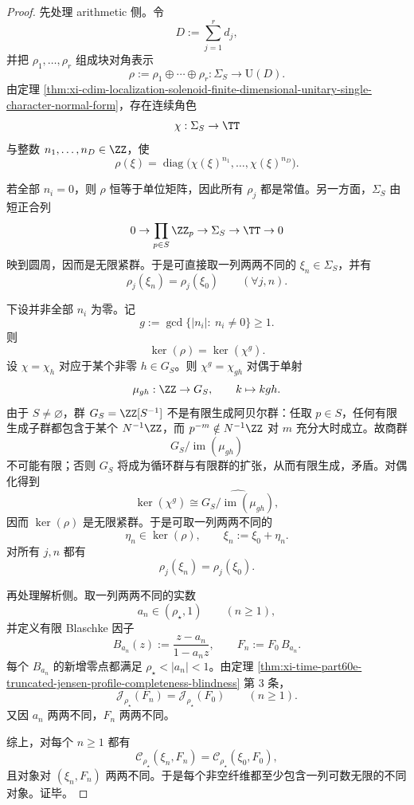 \begin{proof}
先处理 arithmetic 侧。令
\[
D:=\sum_{j=1}^r d_j,
\]
并把 \(\rho_1,\dots,\rho_r\) 组成块对角表示
\[
\rho:=\rho_1\oplus\cdots\oplus \rho_r:\Sigma_S\to \mathrm{U}(D).
\]
由定理 \ref{thm:xi-cdim-localization-solenoid-finite-dimensional-unitary-single-character-normal-form}，存在连续角色
\[
\chi:\Sigma_S\to \TT
\]
与整数 \(n_1,\dots,n_D\in\ZZ\)，使
\[
\rho(\xi)=\operatorname{diag}\bigl(\chi(\xi)^{n_1},\dots,\chi(\xi)^{n_D}\bigr).
\]

若全部 \(n_i=0\)，则 \(\rho\) 恒等于单位矩阵，因此所有 \(\rho_j\) 都是常值。另一方面，\(\Sigma_S\) 由短正合列
\[
0\to \prod_{p\in S}\ZZ_p\to \Sigma_S\to \TT\to 0
\]
映到圆周，因而是无限紧群。于是可直接取一列两两不同的 \(\xi_n\in \Sigma_S\)，并有
\[
\rho_j(\xi_n)=\rho_j(\xi_0)
\qquad
(\forall j,n).
\]

下设并非全部 \(n_i\) 为零。记
\[
g:=\gcd\{|n_i|:\ n_i\neq 0\}\ge 1.
\]
则
\[
\ker(\rho)=\ker(\chi^g).
\]
设 \(\chi=\chi_h\) 对应于某个非零 \(h\in G_S\)。则 \(\chi^g=\chi_{gh}\) 对偶于单射
\[
\mu_{gh}:\ZZ\to G_S,
\qquad
k\mapsto kgh.
\]
由于 \(S\neq \varnothing\)，群 \(G_S=\ZZ[S^{-1}]\) 不是有限生成阿贝尔群：任取 \(p\in S\)，任何有限生成子群都包含于某个 \(N^{-1}\ZZ\)，而 \(p^{-m}\notin N^{-1}\ZZ\) 对 \(m\) 充分大时成立。故商群
\[
G_S/\operatorname{im}(\mu_{gh})
\]
不可能有限；否则 \(G_S\) 将成为循环群与有限群的扩张，从而有限生成，矛盾。对偶化得到
\[
\ker(\chi^g)\cong \widehat{G_S/\operatorname{im}(\mu_{gh})},
\]
因而 \(\ker(\rho)\) 是无限紧群。于是可取一列两两不同的
\[
\eta_n\in \ker(\rho),
\qquad
\xi_n:=\xi_0+\eta_n.
\]
对所有 \(j,n\) 都有
\[
\rho_j(\xi_n)=\rho_j(\xi_0).
\]

再处理解析侧。取一列两两不同的实数
\[
a_n\in (\rho_\star,1)
\qquad(n\ge 1),
\]
并定义有限 Blaschke 因子
\[
B_{a_n}(z):=\frac{z-a_n}{1-a_n z},
\qquad
F_n:=F_0\,B_{a_n}.
\]
每个 \(B_{a_n}\) 的新增零点都满足 \(\rho_\star<|a_n|<1\)。由定理 \ref{thm:xi-time-part60e-truncated-jensen-profile-completeness-blindness} 第 \(3\) 条，
\[
\mathcal J_{\rho_\star}(F_n)=\mathcal J_{\rho_\star}(F_0)
\qquad(n\ge 1).
\]
又因 \(a_n\) 两两不同，\(F_n\) 两两不同。

综上，对每个 \(n\ge 1\) 都有
\[
\mathcal C_{\rho_\star}(\xi_n,F_n)
=
\mathcal C_{\rho_\star}(\xi_0,F_0),
\]
且对象对 \((\xi_n,F_n)\) 两两不同。于是每个非空纤维都至少包含一列可数无限的不同对象。证毕。
\end{proof}

\endinput
